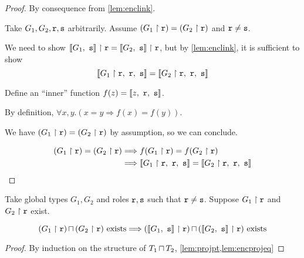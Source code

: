 \begin{proof} By consequence from \cref{lem:enclink}.

Take $G_1, G_2, \mrole{r}, \mrole{s}$ arbitrarily. 
Assume $(\proj{G_1}{r}) = (\proj{G_2}{r})$ and $\mrole{r} \neq \mrole{s}$.

We need to show $\proj{\enc{G_1}{s}}{r} = \proj{\enc{G_2}{s}}{r}$,
but by \cref{lem:enclink}, it is sufficient to show
\[
\enclocal{\proj{G_1}{r}}{r}{s} = \enclocal{\proj{G_2}{r}}{r}{s}
\]

Define an ``inner'' function $f(z) = \enclocal{z}{r}{s}$.

By definition, $\forall x, y. (x = y \Longrightarrow f(x) = f(y))$.

We have $(\proj{G_1}{r}) = (\proj{G_2}{r})$ by assumption,
so we can conclude.

\begin{align*}
(\proj{G_1}{r}) = (\proj{G_2}{r}) 
&\Longrightarrow f(\proj{G_1}{r}) = f(\proj{G_2}{r})  \\
&\Longrightarrow
\enclocal{\proj{G_1}{r}}{r}{s} = \enclocal{\proj{G_2}{r}}{r}{s}
\end{align*}

\end{proof}

\begin{lemma}
Take global types $G_1, G_2$
and roles $\mrole{r}, \mrole{s}$ such that $\mrole{r} \neq \mrole{s}$.
Suppose $\proj{G_1}{r}$ and $\proj{G_2}{r}$ exist.

\[
\tmerge{(\proj{G_1}{r})}{(\proj{G_2}{r})} \text{ exists}
	\Longrightarrow
\tmerge{(\proj{\enc{G_1}{s}}{r})}{(\proj{\enc{G_2}{s}}{r})} 
	\text{ exists}
\]

\label{lem:encglobalpreservemerge}
\end{lemma}

\begin{proof}
By induction on the structure of $\tmerge{T_1}{T_2}$,
\cref{lem:projpt,lem:encprojeq}

\end{proof}
